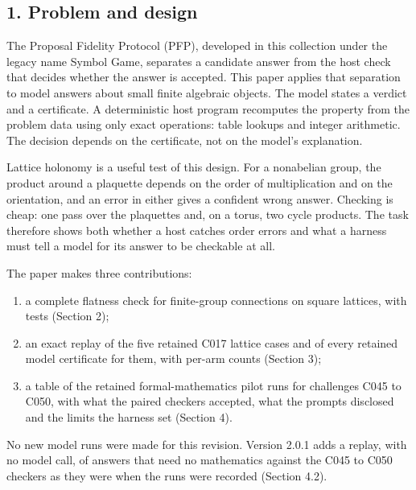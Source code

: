 \documentclass[
  11pt,
]{article}
\providecommand{\tightlist}{%
  \setlength{\itemsep}{0pt}\setlength{\parskip}{0pt}}
\begin{document}
\subsection{1. Problem and design}\label{problem-and-design}

The Proposal Fidelity Protocol (PFP), developed in this collection under
the legacy name Symbol Game, separates a candidate answer from the host
check that decides whether the answer is accepted. This paper applies
that separation to model answers about small finite algebraic objects.
The model states a verdict and a certificate. A deterministic host
program recomputes the property from the problem data using only exact
operations: table lookups and integer arithmetic. The decision depends
on the certificate, not on the model's explanation.

Lattice holonomy is a useful test of this design. For a nonabelian
group, the product around a plaquette depends on the order of
multiplication and on the orientation, and an error in either gives a
confident wrong answer. Checking is cheap: one pass over the plaquettes
and, on a torus, two cycle products. The task therefore shows both
whether a host catches order errors and what a harness must tell a model
for its answer to be checkable at all.

The paper makes three contributions:

\begin{enumerate}
\def\labelenumi{\arabic{enumi}.}
\tightlist
\item
  a complete flatness check for finite-group connections on square
  lattices, with tests (Section 2);
\item
  an exact replay of the five retained C017 lattice cases and of every
  retained model certificate for them, with per-arm counts (Section 3);
\item
  a table of the retained formal-mathematics pilot runs for challenges
  C045 to C050, with what the paired checkers accepted, what the prompts
  disclosed and the limits the harness set (Section 4).
\end{enumerate}

No new model runs were made for this revision. Version 2.0.1 adds a
replay, with no model call, of answers that need no mathematics against
the C045 to C050 checkers as they were when the runs were recorded
(Section 4.2).
\end{document}
